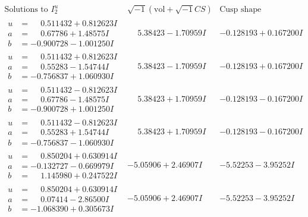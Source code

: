 \documentclass[1p]{elsarticle_modified}
\theoremstyle{definition}
\newcommand{\I}{\sqrt{-1}}
\begin{document}
$$\begin{array}{c|c|c}  
\text{Solutions to }I^u_{2}& \I (\text{vol} + \sqrt{-1}CS) & \text{Cusp shape}\\
 \hline 
\begin{aligned}
u &= \phantom{-}0.511432 + 0.812623 I \\
a &= \phantom{-}0.67786 + 1.48575 I \\
b &= -0.900728 - 1.001250 I\end{aligned}
 & \phantom{-}5.38423 - 1.70959 I & -0.128193 + 0.167200 I \\ \hline\begin{aligned}
u &= \phantom{-}0.511432 + 0.812623 I \\
a &= \phantom{-}0.55283 - 1.54744 I \\
b &= -0.756837 + 1.060930 I\end{aligned}
 & \phantom{-}5.38423 - 1.70959 I & -0.128193 + 0.167200 I \\ \hline\begin{aligned}
u &= \phantom{-}0.511432 - 0.812623 I \\
a &= \phantom{-}0.67786 - 1.48575 I \\
b &= -0.900728 + 1.001250 I\end{aligned}
 & \phantom{-}5.38423 + 1.70959 I & -0.128193 - 0.167200 I \\ \hline\begin{aligned}
u &= \phantom{-}0.511432 - 0.812623 I \\
a &= \phantom{-}0.55283 + 1.54744 I \\
b &= -0.756837 - 1.060930 I\end{aligned}
 & \phantom{-}5.38423 + 1.70959 I & -0.128193 - 0.167200 I \\ \hline\begin{aligned}
u &= \phantom{-}0.850204 + 0.630914 I \\
a &= -0.132727 - 0.669979 I \\
b &= \phantom{-}1.145980 + 0.247522 I\end{aligned}
 & -5.05906 + 2.46907 I & -5.52253 - 3.95252 I \\ \hline\begin{aligned}
u &= \phantom{-}0.850204 + 0.630914 I \\
a &= \phantom{-}0.07414 - 2.86500 I \\
b &= -1.068390 + 0.305673 I\end{aligned}
 & -5.05906 + 2.46907 I & -5.52253 - 3.95252 I \\ \hline\begin{aligned}

\end{aligned}
\end{array}$$
\end{document}
